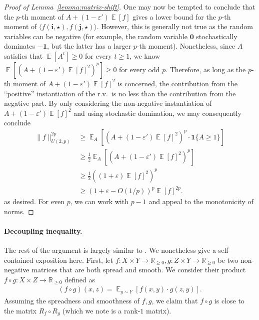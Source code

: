 \documentclass[11pt]{article}
\DeclareMathOperator*{\E}{\mathbb{E}}
\newcommand{\1}{ \mathbbm{1}}
\newcommand{\eps}{\varepsilon}
\begin{document}
\begin{proof}[Proof of Lemma~\ref{lemma:matrix-shift}]
    One may now be tempted to conclude that the $p$-th moment of $A+(1-\eps')\E[f]$ gives a lower bound for the $p$-th moment of $\langle f(\mathbf{i},\star),f(\mathbf{j}, \star)\rangle$. However, this is generally not true as the random variables can be negative (for example, the random variable $\mathbf{0}$ stochastically dominates $\mathbf{-1}$, but the latter has a larger $p$-th moment). Nonetheless, since $A$ satisfies that $\E[A^t]\ge 0$ for every $t\ge 1$, we know $\E[(A+(1-\eps') \E[f]^2)^p]\ge 0$ for every odd $p$. Therefore, as long as the $p$-th moment of $A+(1-\eps')\E[f]^2$ is concerned, the contribution from the ``positive'' instantiation of the r.v.~is no less than the contribution from the negative part. By only considering the non-negative instantiation of $A+(1-\eps')\E[f]^2$ and using stochastic domination, we may consequently conclude
    \begin{align*}
    \|f\|_{U(2,p)}^{2p} 
    &\ge \E_A[(A+(1-\eps')\E[f]^2)^p \cdot \mathbf{1}\{A\ge 1\}]\\
    &\ge \frac{1}{2} \E_{A}[(A+(1-\eps')\E[f]^2)^p] \\
    &\ge \frac{1}{2}((1+\eps)\E[f]^2)^{p} \\
    &\ge (1+ \eps - O(1/p))^p \E[f]^{2p}.
    \end{align*}
    as desired. For even $p$, we can work with $p-1$ and appeal to the monotonicity of norms.
\end{proof}

\paragraph*{Decoupling inequality.} The rest of the argument is largely similar to \cite{KelleyLM2024-nof}. We nonetheless give a self-contained exposition here. First, let $f:X\times Y\to \mathbb{R}_{\ge 0}, g:Z\times Y\to \mathbb{R}_{\ge 0}$ be two non-negative matrices that are both spread and smooth. We consider their product $f\circ g:X\times Z\to \mathbb{R}_{\ge 0}$ defined as
\begin{align}
    (f\circ g)(x,z) = \E_{y\sim Y}[f(x,y) \cdot g(z, y)]. \label{equ:def-matrix-product}
\end{align}
Assuming the spreadness and smoothness of $f,g$, we claim that $f\circ g$ is close to the matrix $R_f\circ R_g$ (which we note is a rank-$1$ matrix).
\end{document}
